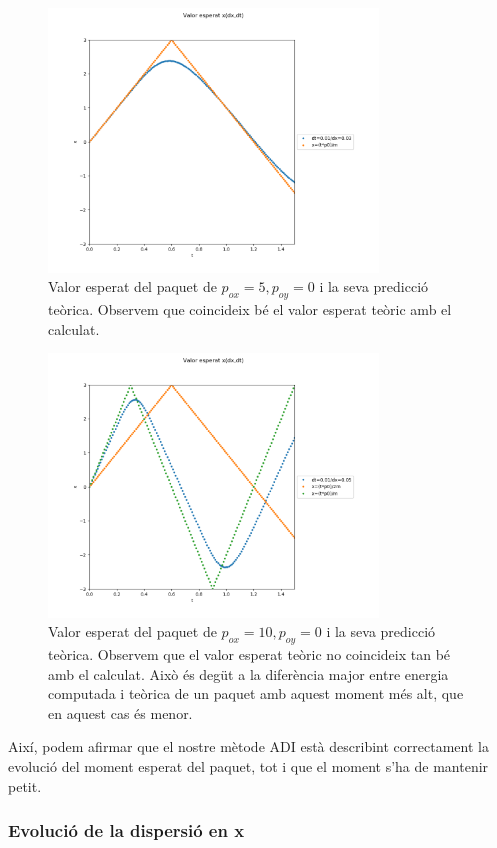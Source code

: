 \documentclass{article}
\begin{document}
\begin{figure}[H]
	\includegraphics[width=\textwidth,height=7cm]{xespxp05dt0.png}
	\caption{Valor esperat del paquet de \(p_{ox}=5,p_{oy}=0\) i la seva predicció teòrica. Observem que coincideix bé el valor esperat teòric amb el calculat. }
\end{figure}
\begin{figure}[H]
	\includegraphics[width=\textwidth,height=7cm]{xespxp010dt0.png}
	\caption{ Valor esperat del paquet de \(p_{ox}=10,p_{oy}=0\) i la seva predicció teòrica. Observem que el valor esperat teòric no coincideix tan bé amb el calculat. Això és degüt a la diferència major entre energia computada i teòrica de un paquet amb aquest moment més alt, que en aquest cas és menor.}
\end{figure}

Així, podem afirmar que el nostre mètode ADI està describint correctament la evolució del moment esperat del paquet, tot i que el moment s'ha de mantenir petit. 

\subsubsection{Evolució de la dispersió en x}
\end{document}
